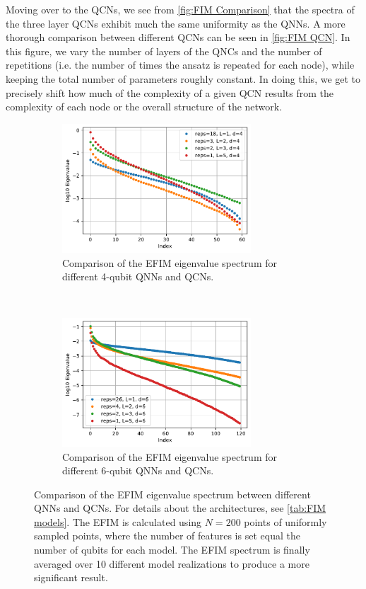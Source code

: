 Moving over to the QCNs, we see from \autoref{fig:FIM Comparison} that the spectra of the three layer QCNs exhibit much the same uniformity as the QNNs. A more thorough comparison between different QCNs can be seen in \autoref{fig:FIM QCN}. In this figure, we vary the number of layers of the QNCs and the number of repetitions (i.e. the number of times the ansatz is repeated for each node), while keeping the total number of parameters roughly constant. In doing this, we get to precisely shift how much of the complexity of a given QCN results from the complexity of each node or the overall structure of the network.

\begin{figure}[H]
    \centering
    \begin{subfigure}[t]{0.5\textwidth}
        \centering
        \includegraphics[height=1.9in]{latex/figures/FIM_qubits_4_comparison.pdf}
        \caption{Comparison of the EFIM eigenvalue spectrum for different 4-qubit QNNs and QCNs.}
        \label{fig:FIM QCN a}
    \end{subfigure}%
    ~ 
    \begin{subfigure}[t]{0.5\textwidth}
        \centering
        \includegraphics[height=1.9in]{latex/figures/FIM_qubits_6_comparison.pdf}
        \caption{Comparison of the EFIM eigenvalue spectrum for different 6-qubit QNNs and QCNs.}
        \label{fig:FIM QCN b}
    \end{subfigure}
    \caption{Comparison of the EFIM eigenvalue spectrum between different QNNs and QCNs. For details about the architectures, see \autoref{tab:FIM models}. The EFIM is calculated using $N=200$ points of uniformly sampled points, where the number of features is set equal the number of qubits for each model. The EFIM spectrum is finally averaged over 10 different model realizations to produce a more significant result.}
    \label{fig:FIM QCN}
\end{figure}

